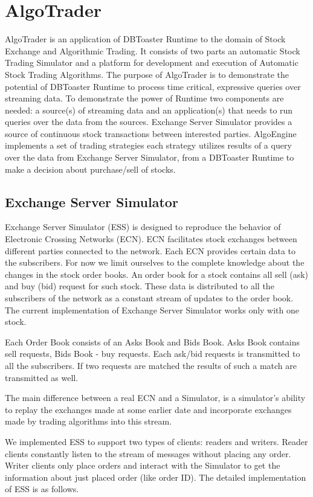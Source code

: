 \documentclass[14pt]{article}
\begin{document}
\section{AlgoTrader}

AlgoTrader is an application of DBToaster Runtime to the domain of Stock Exchange and Algorithmic Trading. It consists of two parts an automatic Stock Trading Simulator and a platform for development and execution of Automatic Stock Trading Algorithms. The purpose of AlgoTrader is to demonstrate the potential of DBToaster Runtime to process time critical, expressive queries over streaming data. To demonstrate the power of Runtime two components are needed: a source(s) of streaming data and an application(s) that needs to run queries over the data from the sources. Exchange Server Simulator provides a source of continuous stock transactions between interested parties. AlgoEngine implements a set of trading strategies each strategy utilizes results of a query over the data from Exchange Server Simulator, from a DBToaster Runtime to make a decision about purchase/sell of stocks. 
  

\subsection{Exchange Server Simulator}
Exchange Server Simulator (ESS) is designed to reproduce the behavior of Electronic Crossing Networks (ECN). ECN facilitates stock exchanges between different parties connected to the network. Each ECN provides certain data to the subscribers. For now we limit ourselves to the complete knowledge about the changes in the stock order books. An order book for a stock contains all sell (ask) and buy (bid) request for such stock. These data is distributed to all the subscribers of the network as a constant stream of updates to the order book. The current implementation of Exchange Server Simulator works only with one stock. 

Each Order Book consists of an Asks Book and Bids Book. Asks Book contains sell requests, Bids Book - buy requests. Each ask/bid requests is transmitted to all the subscribers. If two requests are matched the results of such a match are transmitted as well. 

The main difference between a real ECN and a Simulator, is a simulator's ability to replay the exchanges made at some earlier date and incorporate exchanges made by trading algorithms into this stream. 

We implemented ESS to support two types of clients: readers and writers. Reader clients constantly listen to the stream of messages without placing any order. Writer clients only place orders and interact with the Simulator to get the information about just placed order (like order ID). The detailed implementation of ESS is as follows.
\end{document}
